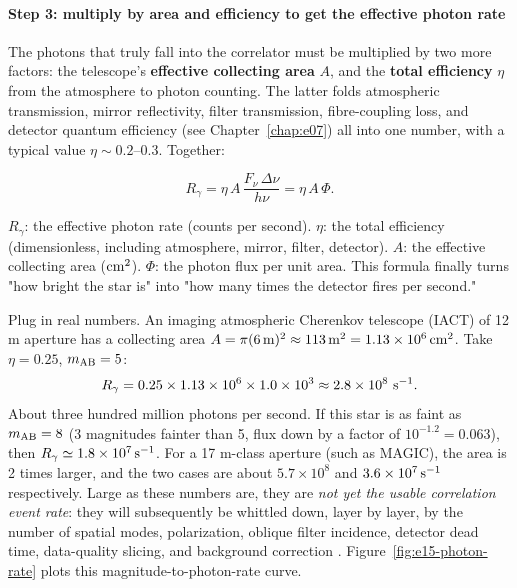 \paragraph{Step 3: multiply by area and efficiency to get the effective photon rate}

The photons that truly fall into the correlator must be multiplied by two more factors: the telescope's \textbf{effective collecting area} $A$, and the \textbf{total efficiency} $\eta$ from the atmosphere to photon counting. The latter folds atmospheric transmission, mirror reflectivity, filter transmission, fibre-coupling loss, and detector quantum efficiency (see Chapter~\ref{chap:e07}) all into one number, with a typical value $\eta\sim0.2$--$0.3$. Together:

\begin{equation}
  R_\gamma
  = \eta\,A\,\frac{F_\nu\,\Delta\nu}{h\nu}
  = \eta\,A\,\Phi .
  \label{eq:e15-photon-rate}
\end{equation}
\begin{formulaexplain}
$R_\gamma$: the effective photon rate (counts per second). $\eta$: the total efficiency (dimensionless, including atmosphere, mirror, filter, detector). $A$: the effective collecting area (${\rm cm^2}$). $\Phi$: the photon flux per unit area. This formula finally turns "how bright the star is" into "how many times the detector fires per second."
\end{formulaexplain}

Plug in real numbers. An imaging atmospheric Cherenkov telescope (IACT) of 12 m aperture has a collecting area $A=\pi(6\,{\rm m})^2\approx113\,{\rm m^2}=1.13\times10^6\,{\rm cm^2}$. Take $\eta=0.25$, $m_{\rm AB}=5$:
\[
  R_\gamma = 0.25\times1.13\times10^6\times1.0\times10^3
          \approx 2.8\times10^8\ {\rm s^{-1}} .
\]
About three hundred million photons per second. If this star is as faint as $m_{\rm AB}=8$ (3 magnitudes fainter than 5, flux down by a factor of $10^{-1.2}=0.063$), then $R_\gamma\simeq1.8\times10^7\,{\rm s^{-1}}$. For a 17 m-class aperture (such as MAGIC), the area is 2 times larger, and the two cases are about $5.7\times10^8$ and $3.6\times10^7\,{\rm s^{-1}}$ respectively. Large as these numbers are, they are \emph{not yet the usable correlation event rate}: they will subsequently be whittled down, layer by layer, by the number of spatial modes, polarization, oblique filter incidence, detector dead time, data-quality slicing, and background correction \citep{2006ApJ...649..399L,2020MNRAS.491.1540A,2021MNRAS.506.1585Z,2024MNRAS.529.4387A}. Figure~\ref{fig:e15-photon-rate} plots this magnitude-to-photon-rate curve.

